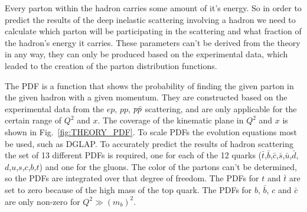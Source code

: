 Every parton within the hadron carries some amount of it's energy. So in order to predict the results of the deep inelastic scattering involving a hadron we need to calculate which parton will be participating in the scattering and what fraction of the hadron's energy it carries. These parameters can't be derived from the theory in any way, they can only be produced based on the experimental data, which leaded to the creation of the parton distribution functions.

\begin{figure}
\end{figure}

The PDF is a function that shows the probability of finding the given parton in the given hadron with a given momentum. They are constructed based on the experimental data from the $ep$, $pp$, $p\bar{p}$ scattering, and are only applicable for the certain range of $Q^{2}$ and $x$. The coverage of the kinematic plane in $Q^{2}$ and $x$ is shown in Fig.~\ref{fig:THEORY_PDF}. To scale PDFs the evolution equations most be used, such as DGLAP. To accurately predict the results of hadron scattering the set of 13 different PDFs is required, one for each of the 12 quarks ($\bar{t}$,$\bar{b}$,$\bar{c}$,$\bar{s}$,$\bar{u}$,$\bar{d}$,$d$,$u$,$s$,$c$,$b$,$t$) and one for the gluons. The color of the partons can't be determined, so the PDFs are integrated over that degree of freedom. The PDFs for $t$ and $\bar{t}$ are set to zero because of the high mass of the top quark. The PDFs for $b$, $\bar{b}$, $c$ and $\bar{c}$ are only non-zero for $Q^{2} \gg (m_{b})^{2}$.

